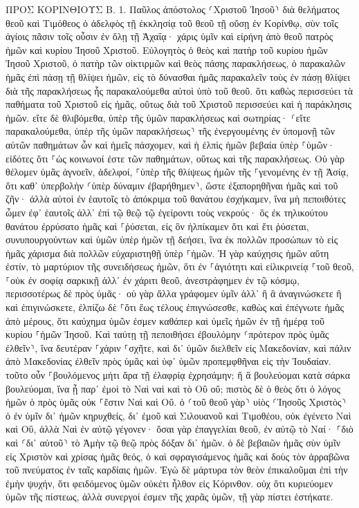 \documentclass[twoside, 9pt]{extreport}
\begin{document}
ΠΡΟΣ ΚΟΡΙΝΘΙΟΥΣ Β.
1.
Παῦλος ἀπόστολος ⸂Χριστοῦ Ἰησοῦ⸃ διὰ θελήματος θεοῦ καὶ Τιμόθεος ὁ ἀδελφὸς τῇ ἐκκλησίᾳ τοῦ θεοῦ τῇ οὔσῃ ἐν Κορίνθῳ, σὺν τοῖς ἁγίοις πᾶσιν τοῖς οὖσιν ἐν ὅλῃ τῇ Ἀχαΐᾳ· 
χάρις ὑμῖν καὶ εἰρήνη ἀπὸ θεοῦ πατρὸς ἡμῶν καὶ κυρίου Ἰησοῦ Χριστοῦ. 
Εὐλογητὸς ὁ θεὸς καὶ πατὴρ τοῦ κυρίου ἡμῶν Ἰησοῦ Χριστοῦ, ὁ πατὴρ τῶν οἰκτιρμῶν καὶ θεὸς πάσης παρακλήσεως, 
ὁ παρακαλῶν ἡμᾶς ἐπὶ πάσῃ τῇ θλίψει ἡμῶν, εἰς τὸ δύνασθαι ἡμᾶς παρακαλεῖν τοὺς ἐν πάσῃ θλίψει διὰ τῆς παρακλήσεως ἧς παρακαλούμεθα αὐτοὶ ὑπὸ τοῦ θεοῦ. 
ὅτι καθὼς περισσεύει τὰ παθήματα τοῦ Χριστοῦ εἰς ἡμᾶς, οὕτως διὰ τοῦ Χριστοῦ περισσεύει καὶ ἡ παράκλησις ἡμῶν. 
εἴτε δὲ θλιβόμεθα, ὑπὲρ τῆς ὑμῶν παρακλήσεως καὶ σωτηρίας· ⸂εἴτε παρακαλούμεθα, ὑπὲρ τῆς ὑμῶν παρακλήσεως⸃ τῆς ἐνεργουμένης ἐν ὑπομονῇ τῶν αὐτῶν παθημάτων ὧν καὶ ἡμεῖς πάσχομεν, 
καὶ ἡ ἐλπὶς ἡμῶν βεβαία ὑπὲρ ⸀ὑμῶν· εἰδότες ὅτι ⸀ὡς κοινωνοί ἐστε τῶν παθημάτων, οὕτως καὶ τῆς παρακλήσεως. 
Οὐ γὰρ θέλομεν ὑμᾶς ἀγνοεῖν, ἀδελφοί, ⸀ὑπὲρ τῆς θλίψεως ἡμῶν τῆς ⸀γενομένης ἐν τῇ Ἀσίᾳ, ὅτι καθ᾽ ὑπερβολὴν ⸂ὑπὲρ δύναμιν ἐβαρήθημεν⸃, ὥστε ἐξαπορηθῆναι ἡμᾶς καὶ τοῦ ζῆν· 
ἀλλὰ αὐτοὶ ἐν ἑαυτοῖς τὸ ἀπόκριμα τοῦ θανάτου ἐσχήκαμεν, ἵνα μὴ πεποιθότες ὦμεν ἐφ᾽ ἑαυτοῖς ἀλλ᾽ ἐπὶ τῷ θεῷ τῷ ἐγείροντι τοὺς νεκρούς· 
ὃς ἐκ τηλικούτου θανάτου ἐρρύσατο ἡμᾶς καὶ ⸀ῥύσεται, εἰς ὃν ἠλπίκαμεν ὅτι καὶ ἔτι ῥύσεται, 
συνυπουργούντων καὶ ὑμῶν ὑπὲρ ἡμῶν τῇ δεήσει, ἵνα ἐκ πολλῶν προσώπων τὸ εἰς ἡμᾶς χάρισμα διὰ πολλῶν εὐχαριστηθῇ ὑπὲρ ⸀ἡμῶν. 
Ἡ γὰρ καύχησις ἡμῶν αὕτη ἐστίν, τὸ μαρτύριον τῆς συνειδήσεως ἡμῶν, ὅτι ἐν ⸀ἁγιότητι καὶ εἰλικρινείᾳ ⸀τοῦ θεοῦ, ⸀οὐκ ἐν σοφίᾳ σαρκικῇ ἀλλ᾽ ἐν χάριτι θεοῦ, ἀνεστράφημεν ἐν τῷ κόσμῳ, περισσοτέρως δὲ πρὸς ὑμᾶς· 
οὐ γὰρ ἄλλα γράφομεν ὑμῖν ἀλλ᾽ ἢ ἃ ἀναγινώσκετε ἢ καὶ ἐπιγινώσκετε, ἐλπίζω δὲ ⸀ὅτι ἕως τέλους ἐπιγνώσεσθε, 
καθὼς καὶ ἐπέγνωτε ἡμᾶς ἀπὸ μέρους, ὅτι καύχημα ὑμῶν ἐσμεν καθάπερ καὶ ὑμεῖς ἡμῶν ἐν τῇ ἡμέρᾳ τοῦ κυρίου ⸀ἡμῶν Ἰησοῦ. 
Καὶ ταύτῃ τῇ πεποιθήσει ἐβουλόμην ⸂πρότερον πρὸς ὑμᾶς ἐλθεῖν⸃, ἵνα δευτέραν ⸀χάριν ⸀σχῆτε, 
καὶ δι᾽ ὑμῶν διελθεῖν εἰς Μακεδονίαν, καὶ πάλιν ἀπὸ Μακεδονίας ἐλθεῖν πρὸς ὑμᾶς καὶ ὑφ᾽ ὑμῶν προπεμφθῆναι εἰς τὴν Ἰουδαίαν. 
τοῦτο οὖν ⸀βουλόμενος μήτι ἄρα τῇ ἐλαφρίᾳ ἐχρησάμην; ἢ ἃ βουλεύομαι κατὰ σάρκα βουλεύομαι, ἵνα ᾖ παρ᾽ ἐμοὶ τὸ Ναὶ ναὶ καὶ τὸ Οὒ οὔ; 
πιστὸς δὲ ὁ θεὸς ὅτι ὁ λόγος ἡμῶν ὁ πρὸς ὑμᾶς οὐκ ⸀ἔστιν Ναὶ καὶ Οὔ. 
ὁ ⸂τοῦ θεοῦ γὰρ⸃ υἱὸς ⸂Ἰησοῦς Χριστὸς⸃ ὁ ἐν ὑμῖν δι᾽ ἡμῶν κηρυχθείς, δι᾽ ἐμοῦ καὶ Σιλουανοῦ καὶ Τιμοθέου, οὐκ ἐγένετο Ναὶ καὶ Οὒ, ἀλλὰ Ναὶ ἐν αὐτῷ γέγονεν· 
ὅσαι γὰρ ἐπαγγελίαι θεοῦ, ἐν αὐτῷ τὸ Ναί· ⸀διὸ καὶ ⸂δι᾽ αὐτοῦ⸃ τὸ Ἀμὴν τῷ θεῷ πρὸς δόξαν δι᾽ ἡμῶν. 
ὁ δὲ βεβαιῶν ἡμᾶς σὺν ὑμῖν εἰς Χριστὸν καὶ χρίσας ἡμᾶς θεός, 
ὁ καὶ σφραγισάμενος ἡμᾶς καὶ δοὺς τὸν ἀρραβῶνα τοῦ πνεύματος ἐν ταῖς καρδίαις ἡμῶν. 
Ἐγὼ δὲ μάρτυρα τὸν θεὸν ἐπικαλοῦμαι ἐπὶ τὴν ἐμὴν ψυχήν, ὅτι φειδόμενος ὑμῶν οὐκέτι ἦλθον εἰς Κόρινθον. 
οὐχ ὅτι κυριεύομεν ὑμῶν τῆς πίστεως, ἀλλὰ συνεργοί ἐσμεν τῆς χαρᾶς ὑμῶν, τῇ γὰρ πίστει ἑστήκατε. 
\end{document}
